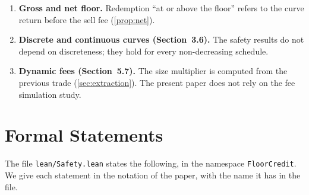 \begin{enumerate}[leftmargin=2em,itemsep=4pt]
\item \textbf{Gross and net floor.} Redemption ``at or above the floor'' refers to the curve return before the sell fee (\cref{prop:net}).
\item \textbf{Discrete and continuous curves (Section~3.6).} The safety results do not depend on discreteness; they hold for every non-decreasing schedule.
\item \textbf{Dynamic fees (Section~5.7).} The size multiplier is computed from the previous trade (\cref{sec:extraction}). The present paper does not rely on the fee simulation study.
\end{enumerate}

\section{Formal Statements}\label{app:lean}

The file \texttt{lean/Safety.lean} states the following, in the namespace \texttt{FloorCredit}. We give each statement in the notation of the paper, with the name it has in the file.

